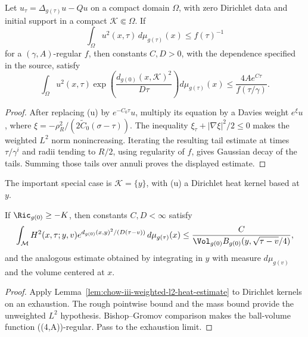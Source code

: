\begin{lemma}
\label{lem:chow-iii-weighted-l2-heat-estimate}
Let \(u_\tau=\Delta_{g(\tau)}u-Qu\) on a compact domain \(\Omega\), with
zero Dirichlet data and initial support in a compact \(\mathcal K\Subset\Omega\).
If
\[
 \int_\Omega u^2(x,\tau)\,d\mu_{g(\tau)}(x)\le f(\tau)^{-1}
\]
for a \((\gamma,A)\)-regular \(f\), then constants \(C,D>0\), with the
dependence specified in the source, satisfy
\[
 \int_\Omega u^2(x,\tau)
 \exp\!\left(\frac{d_{g(0)}(x,\mathcal K)^2}{D\tau}\right)
 d\mu_{g(\tau)}(x)
 \le \frac{4Ae^{C\tau}}{f(\tau/\gamma)}.
\]
\end{lemma}
\begin{proof}
\sketch After replacing (u) by \(e^{-C_0\tau}u\), multiply its equation by a
Davies weight \(e^\xi u\), where
\(\xi=-\rho_R^2/(2\widetilde C_0(\sigma-\tau))\).  The inequality
\(\xi_\tau+|\nabla\xi|^2/2\le0\) makes the weighted \(L^2\) norm
nonincreasing.  Iterating the resulting tail estimate at times
\(\tau/\gamma^i\) and radii tending to \(R/2\), using regularity of \(f\),
gives Gaussian decay of the tails.  Summing those tails over annuli proves
the displayed estimate.
\end{proof}

\begin{remark}
\label{rem:chow-iii-weighted-l2-point-source}
The important special case is \(\mathcal K=\{y\}\), with (u) a Dirichlet
heat kernel based at \(y\).
\end{remark}

\begin{lemma}
\label{lem:chow-iii-heat-kernel-average-gaussian-decay}
If \(\Ric_{g(0)}\ge-K\), then constants \(C,D<\infty\) satisfy
\[
 \int_{\mathcal M}H^2(x,\tau;y,v)
 e^{d_{g(0)}(x,y)^2/(D(\tau-v))}\,d\mu_{g(\tau)}(x)
 \le\frac{C}{\Vol_{g(0)}B_{g(0)}(y,\sqrt{\tau-v}/4)},
\]
and the analogous estimate obtained by integrating in \(y\) with measure
\(d\mu_{g(v)}\) and the volume centered at \(x\).
\end{lemma}
\begin{proof}
\sketch Apply Lemma~\ref{lem:chow-iii-weighted-l2-heat-estimate} to Dirichlet kernels
on an exhaustion.  The rough pointwise bound and the mass bound provide the
unweighted \(L^2\) hypothesis.  Bishop--Gromov comparison makes the ball-volume
function ((4,A))-regular.  Pass to the exhaustion limit.
\end{proof}

